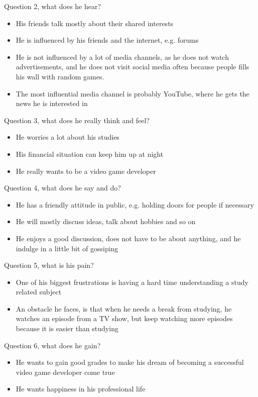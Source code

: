 Question 2, what does he hear?
\begin{itemize}
\item His friends talk mostly about their shared interests
\item He is influenced by his friends and the internet, e.g. forums
\item He is not influenced by a lot of media channels, as he does not watch advertisements, and he does not visit social media often because people fills his wall with random games.
\item The most influential media channel is probably YouTube, where he gets the news he is interested in
\end{itemize}

Question 3, what does he really think and feel?
\begin{itemize}
\item He worries a lot about his studies
\item His financial situation can keep him up at night
\item He really wants to be a video game developer
\end{itemize}

Question 4, what does he say and do?
\begin{itemize}
\item He has a friendly attitude in public, e.g. holding doors for people if necessary
\item He will mostly discuss ideas, talk about hobbies and so on
\item He enjoys a good discussion, does not have to be about anything, and he indulge in a little bit of gossiping 
\end{itemize}

Question 5, what is his pain?
\begin{itemize}
\item One of his biggest frustrations is having a hard time understanding a study related subject
\item An obstacle he faces, is that when he needs a break from studying, he watches an episode from a TV show, but keep watching more episodes because it is easier than studying
\end{itemize}

Question 6, what does he gain?
\begin{itemize}
\item He wants to gain good grades to make his dream of becoming a successful video game developer come true
\item He wants happiness in his professional life
\end{itemize}

